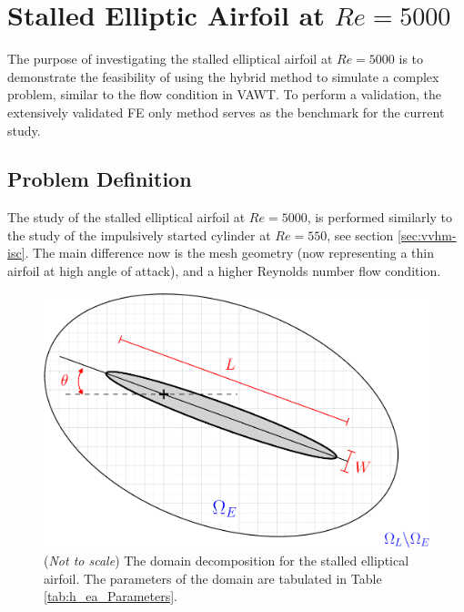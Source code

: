\section{Stalled Elliptic Airfoil at $Re=5000$}
\label{sec:vvhm-ea}

The purpose of investigating the stalled elliptical airfoil at $Re=5000$ is to demonstrate the feasibility of using the hybrid method to simulate a complex problem, similar to the flow condition in VAWT. To perform a validation, the extensively validated FE only method serves as the benchmark for the current study.

\subsection{Problem Definition}

The study of the stalled elliptical airfoil at $Re=5000$, is performed similarly to the study of the impulsively started cylinder at $Re=550$, see section \ref{sec:vvhm-isc}. The main difference now is the mesh geometry (now representing a thin airfoil at high angle of attack), and a higher Reynolds number flow condition.


	\begin{figure}[H]
	\centering
	\includegraphics[width=0.6\linewidth]{./figures/validation/ellipse/hellipticAirfoil_dd-crop.pdf}
	\caption{(\textit{Not to scale}) The domain decomposition for the stalled elliptical airfoil. The parameters of the domain are tabulated in Table \ref{tab:h_ea_Parameters}.}
	\label{fig:hellipticAirfoil_dd-crop}
	\end{figure}

